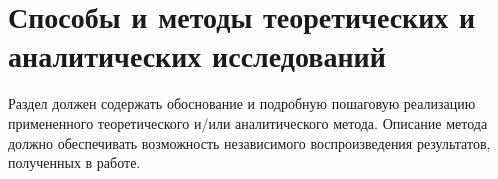 \chapter{Способы и методы теоретических и аналитических исследований} \label{ch:methods}
Раздел должен содержать обоснование и подробную пошаговую реализацию
примененного теоретического и/или аналитического метода. Описание метода должно
обеспечивать возможность независимого воспроизведения результатов, полученных в
работе.



